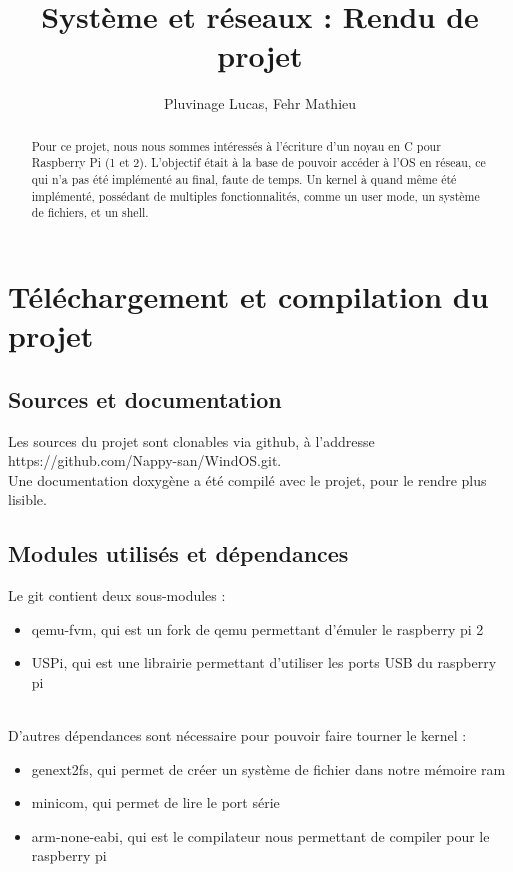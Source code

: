 \documentclass[a4paper]{article}
\author{Pluvinage Lucas, Fehr Mathieu}
\title{Système et réseaux : Rendu de projet}
\begin{document}
\maketitle

\begin{abstract}
  Pour ce projet, nous nous sommes intéressés à l'écriture d'un noyau en C pour
  Raspberry Pi (1 et 2). L'objectif était à la base de pouvoir accéder à l'OS en
  réseau, ce qui n'a pas été implémenté au final, faute de temps. Un kernel à
  quand même été implémenté, possédant de multiples fonctionnalités, comme un
  user mode, un système de fichiers, et un shell.
\end{abstract}

\tableofcontents
\newpage

\section{Téléchargement et compilation du projet}
\subsection{Sources et documentation}

Les sources du projet sont clonables via github, à l'addresse https://github.com/Nappy-san/WindOS.git.\\

Une documentation doxygène a été compilé avec le projet, pour le rendre plus lisible.

\subsection{Modules utilisés et dépendances}

Le git contient deux sous-modules :
\begin{itemize}
\item qemu-fvm, qui est un fork de qemu permettant d'émuler le raspberry pi 2
\item USPi, qui est une librairie permettant d'utiliser les ports USB du
  raspberry pi
\end{itemize}
\ \\
D'autres dépendances sont nécessaire pour pouvoir faire tourner le kernel :
\begin{itemize}
\item genext2fs, qui permet de créer un système de fichier dans notre mémoire ram
\item minicom, qui permet de lire le port série
\item arm-none-eabi, qui est le compilateur nous permettant de compiler pour le
  raspberry pi
\end{itemize}
\end{document}
